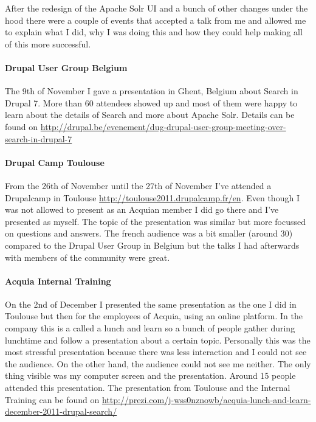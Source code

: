 After the redesign of the Apache Solr UI and a bunch of other changes under the hood there were a couple of events that accepted a talk from me and allowed me to explain what I did, why I was doing this and how they could help making all of this more successful.
 
\paragraph{Drupal User Group Belgium} The 9th of November I gave a presentation in Ghent, Belgium about Search in Drupal 7. More than 60 attendees showed up and most of them were happy to learn about the details of Search and more about Apache Solr. Details can be found on \url{http://drupal.be/evenement/dug-drupal-user-group-meeting-over-search-in-drupal-7}

\paragraph{Drupal Camp Toulouse} From the 26th of November until the 27th of November I've attended a Drupalcamp in Toulouse \url{http://toulouse2011.drupalcamp.fr/en}. Even though I was not allowed to present as an Acquian member I did go there and I've presented as myself. The topic of the presentation was similar but more focussed on questions and answers. The french audience was a bit smaller (around 30) compared to the Drupal User Group in Belgium but the talks I had afterwards with members of the community were great.

\paragraph{Acquia Internal Training} On the 2nd of December I presented the same presentation as the one I did in Toulouse but then for the employees of Acquia, using an online platform. In the company this is a called a lunch and learn so a bunch of people gather during lunchtime and follow a presentation about a certain topic. Personally this was the most stressful presentation because there was less interaction and I could not see the audience. On the other hand, the audience could not see me neither. The only thing visible was my computer screen and the presentation. Around 15 people attended this presentation. The presentation from Toulouse and the Internal Training can be found on \url{http://prezi.com/j-wss0nznowb/acquia-lunch-and-learn-december-2011-drupal-search/}

